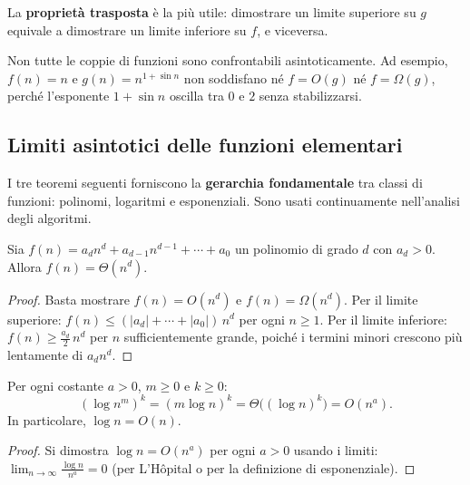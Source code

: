 \begin{nota}
	La \textbf{proprietà trasposta} è la più utile: dimostrare un limite superiore
	su $g$ equivale a dimostrare un limite inferiore su $f$, e viceversa.
\end{nota}

\begin{osservazione}
	Non tutte le coppie di funzioni sono confrontabili asintoticamente.
	Ad esempio, $f(n)=n$ e $g(n)=n^{1+\sin n}$ non soddisfano né
	$f=O(g)$ né $f=\Omega(g)$, perché l'esponente $1+\sin n$
	oscilla tra $0$ e $2$ senza stabilizzarsi.
\end{osservazione}

\subsection{Limiti asintotici delle funzioni elementari}

\begin{softnote}
	I tre teoremi seguenti forniscono la \textbf{gerarchia fondamentale}
	tra classi di funzioni: polinomi, logaritmi e esponenziali.
	Sono usati continuamente nell'analisi degli algoritmi.
\end{softnote}

\begin{teorema}[Polinomi]
	Sia $f(n) = a_d n^d + a_{d-1}n^{d-1} + \cdots + a_0$ un polinomio
	di grado $d$ con $a_d > 0$. Allora $f(n) = \Theta(n^d)$.
\end{teorema}
\begin{proof}
	Basta mostrare $f(n) = O(n^d)$ e $f(n) = \Omega(n^d)$.
	Per il limite superiore: $f(n) \le (|a_d|+\cdots+|a_0|)\,n^d$
	per ogni $n \ge 1$. Per il limite inferiore: $f(n) \ge \frac{a_d}{2}\,n^d$
	per $n$ sufficientemente grande, poiché i termini minori crescono
	più lentamente di $a_d n^d$.
\end{proof}

\begin{teorema}
	Per ogni costante $a > 0$, $m \ge 0$ e $k \ge 0$:
	\[
	(\log n^m)^k = (m \log n)^k = \Theta\!\bigl((\log n)^k\bigr) = O(n^a).
	\]
	In particolare, $\log n = O(n)$.
\end{teorema}
\begin{proof}
	Si dimostra $\log n = O(n^a)$ per ogni $a>0$ usando i limiti:
	$\lim_{n\to\infty} \frac{\log n}{n^a} = 0$ (per L'Hôpital o per
	la definizione di esponenziale).
\end{proof}

